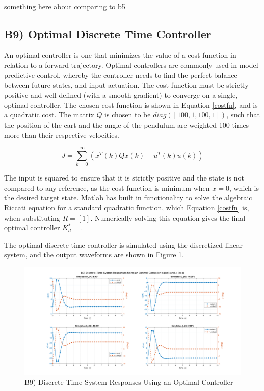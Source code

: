 \documentclass{article}
\begin{document}
something here about comparing to b5

\subsection*{B9) Optimal Discrete Time Controller}
An optimal controller is one that minimizes the value of a cost function in relation to a forward trajectory. Optimal controllers are commonly used in model predictive control, whereby the controller needs to find the perfect balance between future states, and input actuation. The cost function must be strictly positive and well defined (with a smooth gradient) to converge on a single, optimal controller. The chosen cost function is shown in Equation \ref{costfn}, and is a quadratic cost. The matrix $Q$ is chosen to be $diag([100, 1, 100, 1])$, such that the position of the cart and the angle of the pendulum are weighted 100 times more than their respective velocities.

\begin{equation}\label{costfn}
    J = \sum_{k=0}^{\infty} \left( x^T(k) Q x(k) + u^T(k) u(k) \right)
\end{equation}

The input is squared to ensure that it is strictly positive and the state is not compared to any reference, as the cost function is minimum when $\underline{x}=\underline{0}$, which is the desired target state. Matlab has built in functionality to solve the algebraic Riccati equation for a standard quadratic function, which Equation \ref{costfn} is, when substituting $R=[1]$. Numerically solving this equation gives the final optimal controller $K^*_d=$.
\newline

The optimal discrete time controller is simulated using the discretized linear system, and the output waveforms are shown in Figure \ref{B9}.

\begin{figure}[H]
    \centering
    \includegraphics[width=\textwidth]{figures/b9.png}
    \caption{B9) Discrete-Time System Responses Using an Optimal Controller}
    \label{B9}
\end{figure}
\end{document}
